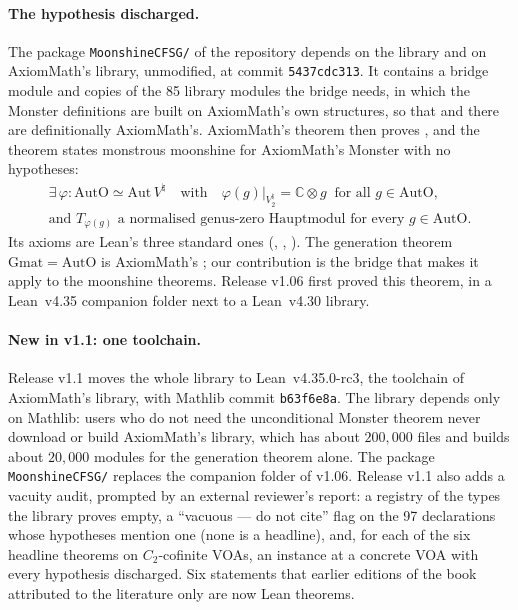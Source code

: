 \documentclass[10pt]{article}
\newcommand{\C}{\mathbb{C}}
\newcommand{\Vn}{V^\natural}
\begin{document}
\paragraph{The hypothesis discharged.} The package \texttt{MoonshineCFSG/} of the repository depends on the library
and on AxiomMath's library, unmodified, at commit \texttt{5437cdc313}. It contains a bridge module and copies of the 85
library modules the bridge needs, in which the Monster definitions are built on AxiomMath's own structures, so that
 and  there are definitionally AxiomMath's. AxiomMath's theorem
 then proves , and the theorem
 states monstrous moonshine for AxiomMath's
Monster with no hypotheses:
\begin{gather*}
  \exists\,\varphi:\mathrm{AutO}\simeq\mathrm{Aut}\,\Vn\quad\text{with}\quad
  \varphi(g)|_{\Vn_2}=\C\otimes g\ \text{ for all } g\in\mathrm{AutO},\\
  \text{and } T_{\varphi(g)} \text{ a normalised genus-zero Hauptmodul for every } g\in\mathrm{AutO}.
\end{gather*}
Its axioms are Lean's three standard ones (, , ). The
generation theorem $\mathrm{Gmat}=\mathrm{AutO}$ is AxiomMath's \cite{AxiomCFSG}; our contribution is the bridge that
makes it apply to the moonshine theorems. Release v1.06 first proved this theorem, in a Lean~v4.35 companion folder
next to a Lean~v4.30 library.

\paragraph{New in v1.1: one toolchain.} Release v1.1 moves the whole library to Lean~v4.35.0-rc3, the toolchain of
AxiomMath's library, with Mathlib commit \texttt{b63f6e8a}. The library depends only on Mathlib: users who do not need
the unconditional Monster theorem never download or build AxiomMath's library, which has about $200{,}000$ files and
builds about $20{,}000$ modules for the generation theorem alone. The package \texttt{MoonshineCFSG/} replaces the
companion folder of v1.06. Release v1.1 also adds a vacuity audit, prompted by an external reviewer's report: a
registry of the types the library proves empty, a ``vacuous --- do not cite'' flag on the 97 declarations whose
hypotheses mention one (none is a headline), and, for each of the six headline theorems on $C_2$-cofinite VOAs, an
instance at a concrete VOA with every hypothesis discharged. Six statements that earlier editions of the book
attributed to the literature only are now Lean theorems.
\end{document}
